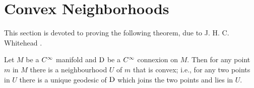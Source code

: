 \documentclass[../main]{subfiles}
\begin{document}
\section{Convex Neighborhoods}\label{ch09:s4}


This section is devoted to proving the following theorem, due to J. H. C. Whitehead \cite{whitehead1932convex}. 



\begin{theorem} \label{thm:ch9.4.1}
Let $M$ be a $C^\infty$ manifold and $\mathrm{D}$ be a $C^\infty$ connexion on $M$. Then for any point $m$ in $M$ there is a neighbourhood $U$ of $m$ that is convex; i.e., for any two points in $U$ there is a unique geodesic of $\mathrm{D}$ which joins the two points and lies in $U$. 
\end{theorem}
\end{document}
